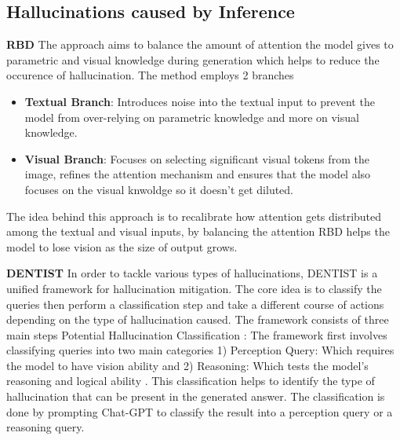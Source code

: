 \documentclass[twocolumn, 9pt]{extarticle}
\begin{document}
\subsection{Hallucinations caused by Inference}

\textbf{RBD} 
The approach aims to balance the amount of attention the model gives to parametric and visual knowledge during generation which helps to reduce the occurence of hallucination. The method employs 2 branches
\begin{itemize}
    \item \textbf{Textual Branch}: Introduces noise into the textual input to prevent the model from over-relying on parametric knowledge and more on visual knowledge.
    \item \textbf{Visual Branch}: Focuses on selecting significant visual tokens from the image, refines the attention mechanism and ensures that the model also focuses on the visual knwoldge so it doesn’t get diluted.
\end{itemize}
The idea behind this approach is to recalibrate how attention gets distributed among the textual and visual inputs, by balancing the attention RBD helps the model to lose vision as the size of output grows.


\textbf{DENTIST} 
In order to tackle various types of hallucinations, DENTIST is a unified framework for hallucination mitigation. The core idea is to classify the queries then perform a classification step and take a different course of actions depending on the type of hallucination caused. The framework consists of three main steps
Potential Hallucination Classification : The framework first involves classifying queries into two main categories 1) Perception Query: Which requires the model to have vision ability and 2) Reasoning: Which tests the model’s reasoning and logical ability . This classification helps to identify the type of hallucination that can be present in the generated answer. The classification is done by prompting Chat-GPT to classify the result into a perception query or a reasoning query. 
\end{document}
